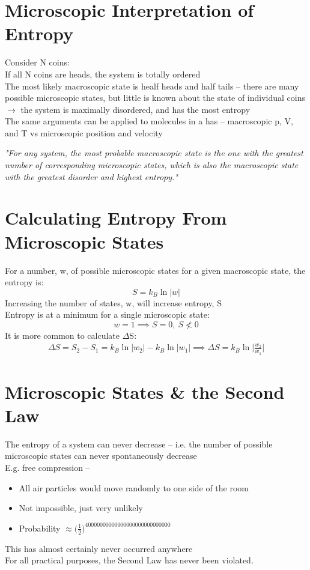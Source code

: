 \documentclass[a4paper, 11pt, fleqn, normalem]{report}
\begin{document}
\section{Microscopic Interpretation of Entropy}
Consider N coins:\\
If all N coins are heads, the system is totally ordered \\
The most likely macroscopic state is healf heads and half tails -- there are many possible microscopic states, but little is known about the state of individual coins $\rightarrow$ the system is maximally disordered, and has the most entropy \\
The same arguments can be applied to molecules in a has -- macroscopic p, V, and T vs microscopic position and velocity

\emph{"For any system, the most probable macroscopic state is the one with the greatest number of corresponding microscopic states, which is also the macroscopic state with the greatest disorder and highest entropy."}

\section{Calculating Entropy From Microscopic States}
For a number, w, of possible microscopic states for a given macroscopic state, the entropy is:
\begin{equation*}
	S = k_{B}\ln{|w|}
\end{equation*}
Increasing the number of states, w, will increase entropy, S \\
Entropy is at a minimum for a single microscopic state:
\begin{equation*}
	w = 1 \implies S = 0, ~ S \nless 0
\end{equation*}
It is more common to calculate $\Delta$S:
\begin{gather*}
	{\Delta}S = S_{2} - S_{1} = k_{B}\ln{|w_{2}|} - k_{B}\ln{|w_{1}|}
	\implies {\Delta}S = k_{B}\ln{\bigg|\frac{w_{2}}{w_{1}}\bigg|}
\end{gather*}

\section{Microscopic States \& the Second Law}
The entropy of a system can never decrease -- i.e. the number of possible microscopic states can never spontaneously decrease \\
E.g. free compression --
\begin{itemize}
	\item All air particles would move randomly to one side of the room
	\item Not impossible, just very unlikely
	\item Probability $\approx \big(\frac{1}{2}\big)^{40000000000000000000000000000}$
\end{itemize}
This has almost certainly never occurred anywhere \\
For all practical purposes, the Second Law has never been violated.
\end{document}
